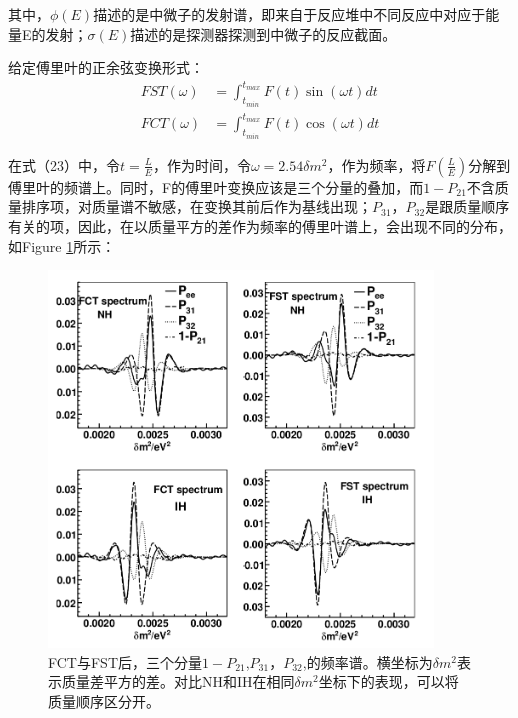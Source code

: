 \documentclass[10pt,a4paper]{article}
\begin{document}
其中，$\phi(E)$描述的是中微子的发射谱，即来自于反应堆中不同反应中对应于能量E的发射；$\sigma(E)$描述的是探测器探测到中微子的反应截面。

给定傅里叶的正余弦变换形式\cite{Zhan:2009rs}\cite{han:2008id}：
\begin{equation}
\label{con:eq27}
\begin{split}
FST(\omega)&=\int_{t_{min}}^{t_{max}}F(t)\sin(\omega t)dt\\
FCT(\omega)&=\int_{t_{min}}^{t_{max}}F(t)\cos(\omega t)dt
\end{split}
\end{equation}


在式（23）中，令$t=\frac{L}{E}$，作为时间，令$\omega=2.54\delta m^2$，作为频率，将$F(\frac{L}{E})$分解到傅里叶的频谱上。同时，F的傅里叶变换应该是三个分量的叠加，而$1-P_{21}$不含质量排序项，对质量谱不敏感，在变换其前后作为基线出现；$P_{31}$，$P_{32}$是跟质量顺序有关的项，因此，在以质量平方的差作为频率的傅里叶谱上，会出现不同的分布，如Figure \ref{fig:1}所示\cite{Zhan:2008id}：
\begin{figure}[H]
 \centering
 \includegraphics[height=10cm]{images/diff-P31-P32.png}
 \caption{FCT与FST后，三个分量$1-P_{21}$,$P_{31}$，$P_{32}$,的频率谱。横坐标为$\delta m^2$表示质量差平方的差。对比NH和IH在相同$\delta m^2$坐标下的表现，可以将质量顺序区分开。}
 \label{fig:1}
\end{figure}
\end{document}
